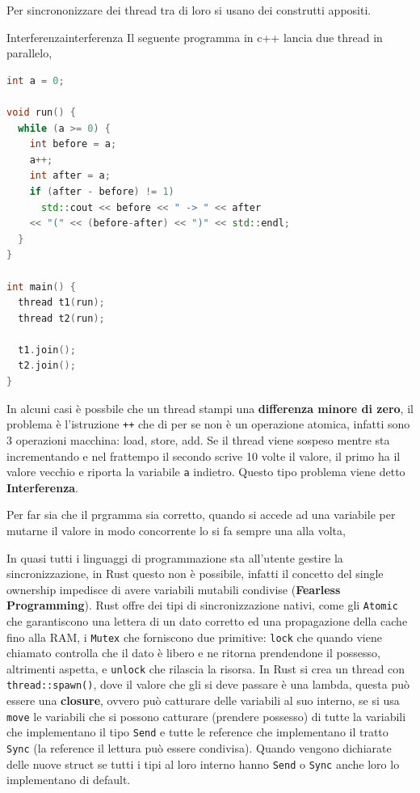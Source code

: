 \documentclass[12pt]{article}
\begin{document}
Per sincrononizzare dei thread tra di loro si usano dei construtti appositi.
\begin{example}{Interferenza}{interferenza}
  Il seguente programma in c++ lancia due thread in parallelo,
  \begin{lstlisting}[language=c++]
int a = 0;

void run() {
  while (a >= 0) {
    int before = a;
    a++;
    int after = a;
    if (after - before) != 1)
      std::cout << before << " -> " << after
	<< "(" << (before-after) << ")" << std::endl;
  }
}

int main() {
  thread t1(run);
  thread t2(run);
 
  t1.join();
  t2.join();
}
  \end{lstlisting}
  In alcuni casi \`e possbile che un thread stampi una \textbf{differenza minore di zero}, il problema \`e l'istruzione \texttt{++} che di per se non \`e un operazione atomica, infatti sono 3 operazioni macchina: load, store, add. Se il thread viene sospeso mentre sta incrementando e nel frattempo il secondo scrive 10 volte il valore, il primo ha il valore vecchio e riporta la variabile \texttt{a} indietro. Questo tipo problema viene detto \textbf{Interferenza}.
\end{example}
Per far sia che il prgramma sia corretto, quando si accede ad una variabile per mutarne il valore in modo concorrente lo si fa sempre una alla volta, 

In quasi tutti i linguaggi di programmazione sta all'utente gestire la sincronizzazione, in Rust questo non \`e possibile, infatti il concetto del single ownership impedisce di avere variabili mutabili condivise (\textbf{Fearless Programming}). Rust offre dei tipi di sincronizzazione nativi, come gli \texttt{Atomic} che garantiscono una lettera di un dato corretto ed una propagazione della cache fino alla RAM, i \texttt{Mutex} che forniscono due primitive: \texttt{lock} che quando viene chiamato controlla che il dato \`e libero e ne ritorna prendendone il possesso, altrimenti aspetta, e \texttt{unlock} che rilascia la risorsa. In Rust si crea un thread con \texttt{thread::spawn()}, dove il valore che gli si deve passare \`e una lambda, questa pu\`o essere una \textbf{closure}, ovvero pu\`o catturare delle variabili al suo interno, se si usa \texttt{move} le variabili che si possono catturare (prendere possesso) di tutte la variabili che implementano il tipo \texttt{Send} e tutte le reference che implementano il tratto \texttt{Sync} (la reference il lettura pu\`o essere condivisa). Quando vengono dichiarate delle nuove struct se tutti i tipi al loro interno hanno \texttt{Send} o \texttt{Sync} anche loro lo implementano di default.
\end{document}

